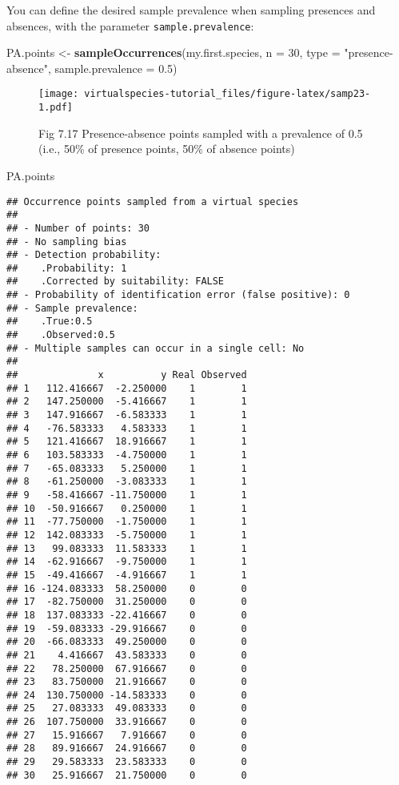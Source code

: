 \documentclass[]{article}
\newenvironment{Shaded}{\begin{snugshade}}{\end{snugshade}}
\newcommand{\KeywordTok}[1]{\textcolor[rgb]{0.13,0.29,0.53}{\textbf{#1}}}
\newcommand{\DataTypeTok}[1]{\textcolor[rgb]{0.13,0.29,0.53}{#1}}
\newcommand{\DecValTok}[1]{\textcolor[rgb]{0.00,0.00,0.81}{#1}}
\newcommand{\FloatTok}[1]{\textcolor[rgb]{0.00,0.00,0.81}{#1}}
\newcommand{\StringTok}[1]{\textcolor[rgb]{0.31,0.60,0.02}{#1}}
\newcommand{\NormalTok}[1]{#1}
\begin{document}
You can define the desired sample prevalence when sampling presences and
absences, with the parameter \texttt{sample.prevalence}:

\begin{Shaded}
\begin{Highlighting}[]
\NormalTok{PA.points <-}\StringTok{ }\KeywordTok{sampleOccurrences}\NormalTok{(my.first.species,}
                               \DataTypeTok{n =} \DecValTok{30}\NormalTok{,}
                               \DataTypeTok{type =} \StringTok{"presence-absence"}\NormalTok{,}
                               \DataTypeTok{sample.prevalence =} \FloatTok{0.5}\NormalTok{)}
\end{Highlighting}
\end{Shaded}

\begin{figure}
\centering
\texttt{[image: virtualspecies-tutorial\_files/figure-latex/samp23-1.pdf]}
\caption{Fig 7.17 Presence-absence points sampled with a prevalence of
0.5 (i.e., 50\% of presence points, 50\% of absence points)}
\end{figure}

\begin{Shaded}
\begin{Highlighting}[]
\NormalTok{PA.points}
\end{Highlighting}
\end{Shaded}

\begin{verbatim}
## Occurrence points sampled from a virtual species
## 
## - Number of points: 30
## - No sampling bias
## - Detection probability: 
##    .Probability: 1
##    .Corrected by suitability: FALSE
## - Probability of identification error (false positive): 0
## - Sample prevalence: 
##    .True:0.5
##    .Observed:0.5
## - Multiple samples can occur in a single cell: No
## 
##              x          y Real Observed
## 1   112.416667  -2.250000    1        1
## 2   147.250000  -5.416667    1        1
## 3   147.916667  -6.583333    1        1
## 4   -76.583333   4.583333    1        1
## 5   121.416667  18.916667    1        1
## 6   103.583333  -4.750000    1        1
## 7   -65.083333   5.250000    1        1
## 8   -61.250000  -3.083333    1        1
## 9   -58.416667 -11.750000    1        1
## 10  -50.916667   0.250000    1        1
## 11  -77.750000  -1.750000    1        1
## 12  142.083333  -5.750000    1        1
## 13   99.083333  11.583333    1        1
## 14  -62.916667  -9.750000    1        1
## 15  -49.416667  -4.916667    1        1
## 16 -124.083333  58.250000    0        0
## 17  -82.750000  31.250000    0        0
## 18  137.083333 -22.416667    0        0
## 19  -59.083333 -29.916667    0        0
## 20  -66.083333  49.250000    0        0
## 21    4.416667  43.583333    0        0
## 22   78.250000  67.916667    0        0
## 23   83.750000  21.916667    0        0
## 24  130.750000 -14.583333    0        0
## 25   27.083333  49.083333    0        0
## 26  107.750000  33.916667    0        0
## 27   15.916667   7.916667    0        0
## 28   89.916667  24.916667    0        0
## 29   29.583333  23.583333    0        0
## 30   25.916667  21.750000    0        0
\end{verbatim}
\end{document}
